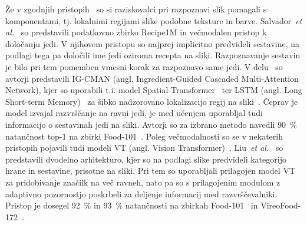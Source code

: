 \documentclass[a4paper,twoside,openright,12pt,slovene]{book}
\newcommand{\etal}{\textit{et al.}} %
\begin{document}
            Že v zgodnjih pristopih~\cite{src:bossard2014food} so si
            raziskovalci pri razpoznavi slik pomagali s komponentami, tj.
            lokalnimi regijami slike podobne teksture in barve. %
            Salvador~\etal~\cite{src:salvador2017learning} so predstavili
            podatkovno zbirko Recipe1M in večmodalen pristop k določanju jedi.
            V njihovem pristopu so najprej implicitno predvideli sestavine, na
            podlagi tega pa določili ime jedi oziroma recepta na sliki.
            Razpoznavanje sestavin je bilo pri tem pomemben vmesni korak za
            razpoznavo same jedi.
            V delu~\cite{src:min2019ingredient} so avtorji predstavili IG-CMAN
            (angl. Ingredient-Guided Cascaded Multi-Attention Network), kjer so
            uporabili t.i. model Spatial Transformer~\cite{src:jaderberg2015spatialtransformer} %
            ter LSTM (angl. Long Short-term
            Memory)~\cite{src:hochreiter1997lstm} za šibko nadzorovano
            lokalizacijo regij na sliki~\cite{src:wang2017multi}. Čeprav je
            model izvajal razvrščanje na ravni jedi, je med učenjem uporabljal
            tudi informacijo o sestavinah jedi na sliki. Avtorji so za izbrano
            metodo navedli 90~\% natančnost top-1 na zbirki
            Food-101~\cite{src:bossard2014food}.
            Poleg večmodalnosti so se v nekaterih pristopih pojavili tudi modeli VT
            (angl. Vision Transformer)~\cite{src:dosovitskiy2020image}.
            Liu~\etal~\cite{src:liu2024convolution} so predstavili dvodelno
            arhitekturo, kjer so na podlagi slike predvideli kategorijo hrane
            in sestavine, prisotne na sliki. Pri tem so uporabljali prilagojen
            model VT za pridobivanje značilk na več ravneh, nato pa so s
            prilagojenim modulom z adaptivno pozornostjo poskrbeli za deljenje
            informacij med razvrščevalniki. Pristop je dosegel 92~\% in 93~\%
            natančnosti na zbirkah \mbox{Food-101}~\cite{src:bossard2014food}
            in \mbox{VireoFood-172}~\cite{src:chen2016deep}.
\end{document}
